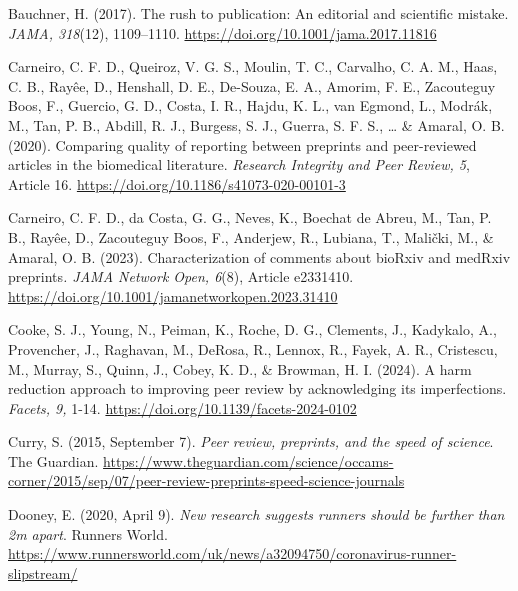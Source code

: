 \documentclass[authordate, perspective, issue]{jote-new-article}
\begin{document}
	Bauchner, H. (2017). The rush to publication: An editorial and scientific mistake. \emph{JAMA, 318}(12), 1109--1110. \url{https://doi.org/10.1001/jama.2017.11816}







	Carneiro, C. F. D., Queiroz, V. G. S., Moulin, T. C., Carvalho, C. A. M., Haas, C. B., Rayêe, D., Henshall, D. E., De-Souza, E. A., Amorim, F. E., Zacouteguy Boos, F., Guercio, G. D., Costa, I. R., Hajdu, K. L., van Egmond, L., Modrák, M., Tan, P. B., Abdill, R. J., Burgess, S. J., Guerra, S. F. S., … \& Amaral, O. B. (2020). Comparing quality of reporting between preprints and peer-reviewed articles in the biomedical literature. \emph{Research Integrity and Peer Review, 5}, Article 16. \url{https://doi.org/10.1186/s41073-020-00101-3}







	Carneiro, C. F. D., da Costa, G. G., Neves, K., Boechat de Abreu, M., Tan, P. B., Rayêe, D., Zacouteguy Boos, F., Anderjew, R., Lubiana, T., Malički, M., \& Amaral, O. B. (2023). Characterization of comments about bioRxiv and medRxiv preprints\emph{. JAMA Network Open, 6}(8), Article e2331410. \url{https://doi.org/10.1001/jamanetworkopen.2023.31410}







	Cooke, S. J., Young, N., Peiman, K., Roche, D. G., Clements, J., Kadykalo, A., Provencher, J., Raghavan, M., DeRosa, R., Lennox, R., Fayek, A. R., Cristescu, M., Murray, S., Quinn, J., Cobey, K. D., \& Browman, H. I. (2024). A harm reduction approach to improving peer review by acknowledging its imperfections. \emph{Facets, 9, }1-14. \url{https://doi.org/10.1139/facets-2024-0102}







	Curry, S. (2015, September 7). \emph{Peer review, preprints, and the speed of science}. The Guardian. \url{https://www.theguardian.com/science/occams-corner/2015/sep/07/peer-review-preprints-speed-science-journals}







	Dooney, E. (2020, April 9). \emph{New research suggests runners should be further than 2m apart}. Runners World. \url{https://www.runnersworld.com/uk/news/a32094750/coronavirus-runner-slipstream/}
\end{document}
